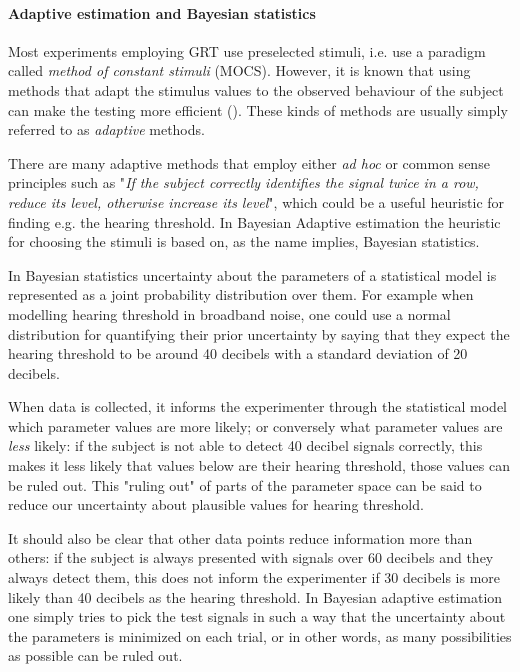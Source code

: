 \documentclass{article}\usepackage{knitr}
\begin{document}
\paragraph{Adaptive estimation and Bayesian statistics}

Most experiments employing GRT use preselected stimuli, i.e. use a paradigm called \textit{method of constant stimuli} (MOCS). However, it is known that using methods that adapt the stimulus values to the observed behaviour of the subject can make the testing more efficient (\citealp{kontsevichtyler1999}). These kinds of methods are usually simply referred to as \textit{adaptive} methods.

There are many adaptive methods that employ either \textit{ad hoc} or common sense principles such as "\textit{If the subject correctly identifies the signal twice in a row, reduce its level, otherwise increase its level}", which could be a useful heuristic for finding e.g. the hearing threshold. In Bayesian Adaptive estimation the heuristic for choosing the stimuli is based on, as the name implies, Bayesian statistics. 

In Bayesian statistics uncertainty about the parameters of a statistical model is represented as a joint probability distribution over them. For example when modelling hearing threshold in broadband noise, one could use a normal distribution for quantifying their prior uncertainty by saying that they expect the hearing threshold to be around 40 decibels with a standard deviation of 20 decibels. 

When data is collected, it informs the experimenter through the statistical model which parameter values are more likely; or conversely what parameter values are \textit{less} likely: if the subject is not able to detect 40 decibel signals correctly, this makes it less likely that values below are their hearing threshold, those values can be ruled out. This "ruling out" of parts of the parameter space can be said to reduce our uncertainty about plausible values for hearing threshold. 

It should also be clear that other data points reduce information more than others: if the subject is always presented with signals over 60 decibels and they always detect them, this does not inform the experimenter if 30 decibels is more likely than 40 decibels as the hearing threshold. In Bayesian adaptive estimation one simply tries to pick the test signals in such a way that the uncertainty about the parameters is minimized on each trial, or in other words, as many possibilities as possible can be ruled out. 
\end{document}
